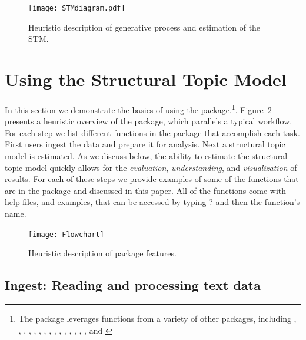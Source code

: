 \documentclass[article,shortnames]{jss}
\begin{document}
\begin{figure}
  \centering
  \texttt{[image: STMdiagram.pdf]}
  \caption{Heuristic description of generative process and estimation of the STM.}\label{fig:stmoverview}
\end{figure}

\FloatBarrier

\section{Using the Structural Topic Model}
\label{sec:use}

In this section we demonstrate the basics of using the package.\footnote{The  package leverages functions from a variety of other packages, including  \citep{eddelbuettel2011rcpp},  \citep{RcppArmadillo},  \citep{MatrixStats},  \citep{slam},  \citep{lda},  \citep{stringr},  \citep{SnowballC},  \citep{meyer2008text},  \citep{igraph},  \citep{huge},  \citep{friedman2010regularization},  \citep{hornik2005clue},  \citep{wordcloud},  \citep{KernSmooth},  \citep{geometry}, and  \citep{Rtsne}}. Figure~\ref{fig:stmreview} presents a heuristic overview of the package, which parallels a typical workflow. For each step we list different functions in the  package that accomplish each task. First users ingest the data and prepare it for analysis. Next a structural topic model is estimated. As we discuss below, the ability to estimate the structural topic model quickly allows for the \emph{evaluation}, \emph{understanding}, and \emph{visualization} of results. For each of these steps we provide examples of some of the functions that are in the package and discussed in this paper. All of the functions come with help files, and examples, that can be accessed by typing ? and then the function's name.



\begin{figure}
  \centering
  \texttt{[image: Flowchart]}
  \caption{Heuristic description of  package features.}\label{fig:stmreview}
\end{figure}

\FloatBarrier



\subsection{Ingest: Reading and processing text data}
\end{document}
